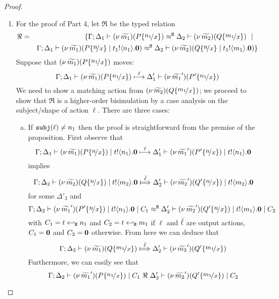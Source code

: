 \begin{proof}
\begin{enumerate}[1.]
		\item	For the proof of Part 4, let $\Re$ be the typed relation
				\begin{eqnarray*}
					\Re &=& \set{	\horel{\Gamma}{\Delta_1}{ \newsp{\widetilde{m_1}}{P \subst{n_1}{x} }}
									{\hwb}
									{\Delta_2}{ \newsp{\widetilde{m_2}}{Q \subst{m_1}{x} }} \setbar \\
						&&
									\horel{\Gamma}{\Delta_1}{ \newsp{\widetilde{m_1}}{P \subst{n}{x} \Par \bout{t_1}{n_1} \inact }}
									{\hwb}
									{\Delta_2}{ \newsp{\widetilde{m_2}}{Q \subst{n}{x} \Par \bout{t_1}{m_1} \inact }}
					}
				\end{eqnarray*}
				Suppose that $\newsp{\widetilde{m_1}}{P \subst{n_1}{x}}$ moves:
				\[
					\horel{\Gamma}{\Delta_1}{\newsp{\widetilde{m_1}}{P \subst{n_1}{x}}}
					{\hby{\ell}}
					{\Delta_1'}{\newsp{\widetilde{m_1}'}{P' \subst{n_1}{x}}}
				\]
				We need to show a matching action from $\newsp{\widetilde{m_2}}{Q \subst{m_1}{x}}$;
				we proceed to show that $\Re$ is a higher-order bisimulation by a case analysis on the subject/shape of action $\ell$.
				There are three cases:
				\begin{enumerate}[(a)]
					\item	If $\mathtt{subj}(\ell) \not= n_1$ then the proof is straightforward from the premise of the proposition.
							First observe that
							\[
								\horel{\Gamma}{\Delta_1}{\newsp{\widetilde{m_1}}{P \subst{n}{x}} \Par \bout{t}{n_1} \inact}
								{\hby{\ell}}
								{\Delta_1'}{\newsp{\widetilde{m_1}'}{P' \subst{n}{x}} \Par \bout{t}{n_1} \inact}
							\]
							implies
							\[
								\horel{\Gamma}{\Delta_2}{\newsp{\widetilde{m_2}}{Q \subst{n}{x}} \Par \bout{t}{m_2} \inact}
								{\Hby{\mact{\ell}}}
								{\Delta_2'}{\newsp{\widetilde{m_2}'}{Q' \subst{n}{x}} \Par \bout{t}{m_2} \inact}
							\]
							for some $\Delta'_2$
							and
							\[
								\horel{\Gamma}{\Delta_2}{\newsp{\widetilde{m_1}'}{P' \subst{n}{x}} \Par \bout{t}{n_1} \inact \Par C_1}
								{\hwb}
								{\Delta_2'}{\newsp{\widetilde{m_2}'}{Q' \subst{n}{x}} \Par \bout{t}{m_1} \inact \Par C_2}
							\]
							with $C_1 = t \hookleftarrow_{\mathtt{H}} n_1$ and $C_2 = t \hookleftarrow_{\mathtt{H}} m_1$ if $\ell$ and $\breve{\ell}$ are output actions,
							$C_1 = \mathbf{0}$ and $C_2 = \mathbf{0}$ otherwise.
							From here we can deduce that 
							\[
								\horel{\Gamma}{\Delta_2}{\newsp{\widetilde{m_1}}{Q \subst{m_1}{x}}}
								{\Hby{\mact{\ell}}}
								{\Delta_2'}{\newsp{\widetilde{m_2}'}{Q' \subst{m_1}{x}}}
							\]
							Furthermore, we can easily see that
							\[
								\horel{\Gamma}{\Delta_2}{\newsp{\widetilde{m_1}'}{P \subst{n_1}{x}} \Par C_1}
								{\ \Re\ }
								{\Delta_2'}{\newsp{\widetilde{m_2}'}{Q' \subst{m_1}{x}} \Par C_2}
							\]


\end{enumerate}
\end{enumerate}
\end{proof}
